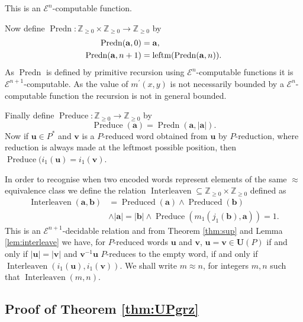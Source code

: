 \documentclass[a4paper]{article}
\newcommand{\grz}[1]{$\mathcal{E}^{#1}$}	%
\newcommand{\ZZ}{\mathbb{Z}}
\newcommand{\maps}{\longrightarrow}
\newcommand{\avec}{\mathbf{a}}	%
\newcommand{\bvec}{\mathbf{b}}	%
\newcommand{\uvec}{\mathbf{u}}	%
\newcommand{\vvec}{\mathbf{v}}	%
\newcommand{\Uvec}{\mathbf{U}}	%
\newcommand{\UP}{\Uvec(P)}
\newcommand{\Preduced}{\operatorname{Preduced}}
\newcommand{\leftm}{\operatorname{leftm}}
\newcommand{\Predn}{\operatorname{Predn}}
\newcommand{\Preduce}{\operatorname{Preduce}}
\newcommand{\Interleaven}{\operatorname{Interleaven}}
\theoremstyle{plain}
\theoremstyle{definition}
\begin{document}
This is an \grz{n}-computable function. 

Now define $\Predn:\ZZ_{\geq 0}\times \ZZ_{\geq 0} \maps \ZZ_{\geq 0}$ by
\begin{align}
\Predn(\avec,0) & = \avec,\notag\\
\Predn(\avec, n+1) & = \leftm(\Predn(\avec,n))\label{eq:Pr}.
\end{align} 
As $\Predn$ is defined by primitive recursion using \grz{n}-computable functions it
is \grz{n+1}-computable. As the value of $m^\prime(x,y)$ is not necessarily bounded by
a \grz{n}-computable function the recursion is not in general bounded.

Finally define $\Preduce:\ZZ_{\geq 0}\maps \ZZ_{\geq 0}$ by
\begin{equation}\label{eq:Preduce}
\Preduce(\avec)=\Predn(\avec,|\avec|).
\end{equation}
Now if $\uvec \in P^\ast$ and $\vvec$ is a $P$-reduced word 
obtained from $\uvec$ by $P$-reduction, where reduction is always made 
at the leftmost possible position, then $\Preduce(i_1(\uvec)=i_1(\vvec)$. 

In order to recognise when two encoded words represent elements of the same
$\approx$ equivalence class we define the relation $\Interleaven\subseteq \ZZ_{\geq 0}\times \ZZ_{\geq 0}$ 
defined as 
\begin{equation}\label{eq:interleaven}
\begin{split}
\Interleaven(\avec,\bvec) &=\Preduced(\avec)\wedge \Preduced(\bvec) \\ 
&\wedge |\avec|=|\bvec|
\wedge \Preduce(m_1(j_1(\bvec),\avec))=1.
\end{split}
\end{equation}
This is an \grz{n+1}-decidable relation and from Theorem \ref{thm:sup} and Lemma \ref{lem:interleave} we have,
for $P$-reduced words $\uvec$ and $\vvec$, 
$\uvec=\vvec\in \UP$ if and only if  $|\uvec|=|\vvec|$ and $\vvec^{-1}\uvec$ $P$-reduces to the
empty word,  if and only if $\Interleaven(i_1(\uvec),i_1(\vvec))$.  
We shall write $m\approx n$, for integers $m,n$ such that $\Interleaven(m,n)$. 
\subsection{Proof of Theorem \ref{thm:UPgrz}}
\end{document}
